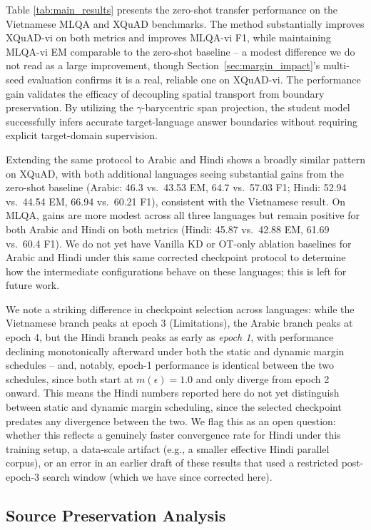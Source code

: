 \documentclass[11pt]{article}
\begin{document}
Table \ref{tab:main_results} presents the zero-shot transfer performance on the Vietnamese MLQA and XQuAD benchmarks. The method substantially improves XQuAD-vi on both metrics and improves MLQA-vi F1, while maintaining MLQA-vi EM comparable to the zero-shot baseline -- a modest difference we do not read as a large improvement, though Section~\ref{sec:margin_impact}'s multi-seed evaluation confirms it is a real, reliable one on XQuAD-vi. The performance gain validates the efficacy of decoupling spatial transport from boundary preservation. By utilizing the $\gamma$-barycentric span projection, the student model successfully infers accurate target-language answer boundaries without requiring explicit target-domain supervision.

Extending the same protocol to Arabic and Hindi shows a broadly similar pattern on XQuAD, with both additional languages seeing substantial gains from the zero-shot baseline (Arabic: 46.3 vs.\ 43.53 EM, 64.7 vs.\ 57.03 F1; Hindi: 52.94 vs.\ 44.54 EM, 66.94 vs.\ 60.21 F1), consistent with the Vietnamese result. On MLQA, gains are more modest across all three languages but remain positive for both Arabic and Hindi on both metrics (Hindi: 45.87 vs.\ 42.88 EM, 61.69 vs.\ 60.4 F1). We do not yet have Vanilla KD or OT-only ablation baselines for Arabic and Hindi under this same corrected checkpoint protocol to determine how the intermediate configurations behave on these languages; this is left for future work.

We note a striking difference in checkpoint selection across languages: while the Vietnamese branch peaks at epoch 3 (Limitations), the Arabic branch peaks at epoch 4, but the Hindi branch peaks as early as \emph{epoch 1}, with performance declining monotonically afterward under both the static and dynamic margin schedules -- and, notably, epoch-1 performance is identical between the two schedules, since both start at $m(\epsilon)=1.0$ and only diverge from epoch 2 onward. This means the Hindi numbers reported here do not yet distinguish between static and dynamic margin scheduling, since the selected checkpoint predates any divergence between the two. We flag this as an open question: whether this reflects a genuinely faster convergence rate for Hindi under this training setup, a data-scale artifact (e.g., a smaller effective Hindi parallel corpus), or an error in an earlier draft of these results that used a restricted post-epoch-3 search window (which we have since corrected here).

\subsection{Source Preservation Analysis}
\end{document}
